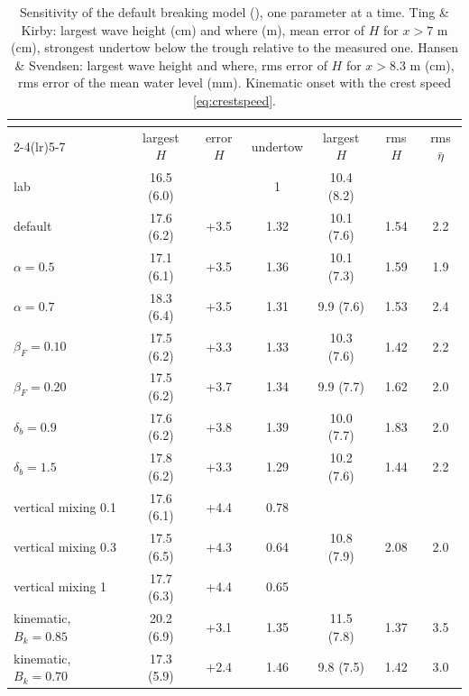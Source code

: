 \begin{table}[!htbp]
\centering
\caption{Sensitivity of the default breaking model (), one
parameter at a time. Ting \& Kirby: largest wave height (cm) and where (m),
mean error of $H$ for $x > 7$ m (cm), strongest undertow below the trough
relative to the measured one. Hansen \& Svendsen: largest wave height and
where, rms error of $H$ for $x > 8.3$ m (cm), rms error of the mean water
level (mm). Kinematic onset with the crest speed \eqref{eq:crestspeed}.}
\label{tab:brk-sens}
\small
\setlength{\tabcolsep}{4pt}
\begin{tabular}{lcccccc}
\toprule
 & \multicolumn{3}{c}{\citet{ting1994}} & \multicolumn{3}{c}{\citet{hansen1979}} \\
\cmidrule(lr){2-4}\cmidrule(lr){5-7}
 & largest $H$ & error $H$ & undertow & largest $H$ & rms $H$ & rms $\bar\eta$ \\
\midrule
lab & 16.5 (6.0) &  & 1 & 10.4 (8.2) &  &  \\
default & 17.6 (6.2) & +3.5 & 1.32 & 10.1 (7.6) & 1.54 & 2.2 \\
$\alpha = 0.5$ & 17.1 (6.1) & +3.5 & 1.36 & 10.1 (7.3) & 1.59 & 1.9 \\
$\alpha = 0.7$ & 18.3 (6.4) & +3.5 & 1.31 & 9.9 (7.6) & 1.53 & 2.4 \\
$\beta_F = 0.10$ & 17.5 (6.2) & +3.3 & 1.33 & 10.3 (7.6) & 1.42 & 2.2 \\
$\beta_F = 0.20$ & 17.5 (6.2) & +3.7 & 1.34 & 9.9 (7.7) & 1.62 & 2.0 \\
$\delta_b = 0.9$ & 17.6 (6.2) & +3.8 & 1.39 & 10.0 (7.7) & 1.83 & 2.0 \\
$\delta_b = 1.5$ & 17.8 (6.2) & +3.3 & 1.29 & 10.2 (7.6) & 1.44 & 2.2 \\
vertical mixing 0.1 & 17.6 (6.1) & +4.4 & 0.78 &  &  &  \\
vertical mixing 0.3 & 17.5 (6.5) & +4.3 & 0.64 & 10.8 (7.9) & 2.08 & 2.0 \\
vertical mixing 1 & 17.7 (6.3) & +4.4 & 0.65 &  &  &  \\
kinematic, $B_k = 0.85$ & 20.2 (6.9) & +3.1 & 1.35 & 11.5 (7.8) & 1.37 & 3.5 \\
kinematic, $B_k = 0.70$ & 17.3 (5.9) & +2.4 & 1.46 & 9.8 (7.5) & 1.42 & 3.0 \\
\bottomrule
\end{tabular}
\end{table}


